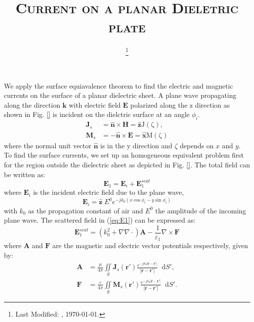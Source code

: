 \documentclass[11pt]{article}
\renewcommand{\v}[1]{\mathbf{#1}} %
\newcommand{\E}{\varepsilon}  %
\renewcommand{\u}{\mu}  %
\newcommand{\x}{\times}  %
\renewcommand{\del}{\nabla}  %
\renewcommand{\^}{\hat}  %
\newcommand*\diff{\mathop{}\!\mathrm{d}} %
\begin{document}
\title{\textsc{Current on a planar Dieletric plate}\\}
\date{\footnote{Last Modified: \currenttime, \today.}}
\maketitle
%
We apply the surface equiavalence theorem to find the electric and magnetic currents on the surface of a planar dielectric sheet. A plane wave propagating along the direction $\mathbf{k}$ with electric field $\mathbf{E}$ polarized along the z direction as shown in Fig. \ref{} is incident on the dielctric surface at an angle $\phi_i$.
%
\begin{subequations}
  \begin{align}
    \v J_s &=  \hat{\v{n}} \x \v{H} = \hat {\v{z}} \mathrm{J(\zeta)},
    \label{eq:J_s}\\
    \v M_s &=  -\hat{\v{n}} \x \v{E} = \hat {\v{x}} \mathrm{M(\zeta)}
    \label{eq:M_s}
  \end{align}
  \label{eq:eq_currents}
\end{subequations}
%
where the normal unit vector $\hat{\v{n}}$ is in the y direction and $\zeta$ depends on $x$ and $y$. To find the surface currents, we set up an homogeneous equivalent problem first for the region outside the dielectric sheet as depicted in Fig. \ref{}. The total field can be written as:
%
\begin{equation}
  \v E_1 = \v E_i + \v E_1^{scat}
  \label{eq:E1}
\end{equation}
%
where $\v E_i$ is the incident electric field due to the plane wave,
%
\begin{equation}
  \v E_i = \hat{\v z} \; E^0  e^{-j k_0 (x \cos \phi_i - y \sin \phi_i)}
  \label{eq:E_i}
\end{equation}
%
with $k_0$ as the propagation constant of air and $E^0$ the amplitude of the incoming plane wave. The scattered field in (\ref{eq:E1}) can be expressed as:
%
\begin{equation}
  \v E_1^{scat} = \left( k_0^2 + \del \del \cdot \right) \v A
  - \frac{1}{\E_1} \del \x \v F
  \label{eq:E1scat}
\end{equation}
%
where $\v A$ and $\v F$ are the magnetic and electric vector potentials respectively, given by:
%
\begin{subequations}
  \begin{align}
    \v A &=  \frac{\u}{4 \pi} \iint\limits_{S} \v J_s(\v r') \frac{ e^{-j k_0 |\v r - \v r'|}}{|\v r - \v r'|} \diff{S'},
    \label{eq:A}\\
    \v F &=  \frac{\E}{4 \pi} \iint\limits_{S} \v M_s(\v r') \frac{ e^{-j k_0 |\v r - \v r'|}}{|\v r - \v r'|} \diff{S'}.
    \label{eq:Fig}
  \end{align}
  \label{eq:potentials}
\end{subequations}
\end{document}
